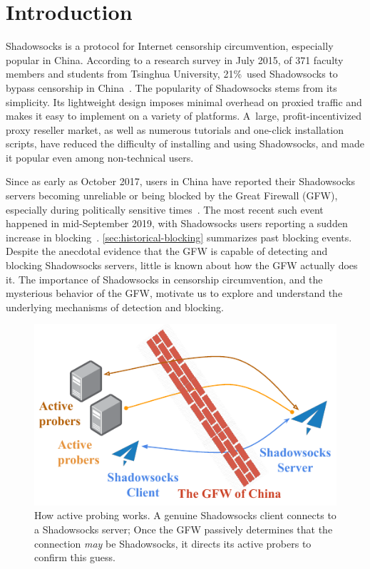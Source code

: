 \documentclass[sigconf,letterpaper]{acmart}
\begin{document}
\maketitle

\section{Introduction}
\label{sec:intro}

Shadowsocks is a protocol for Internet censorship circumvention,
especially popular in China.
According to a research survey in July 2015,
of 371 faculty members and students from Tsinghua University,
21\%~used Shadowsocks to bypass censorship in China~\cite[\S 4.1]{Lu2017a}.
The popularity of Shadowsocks stems from its simplicity.
Its lightweight design imposes minimal overhead on proxied traffic
and makes it easy to implement on a variety of platforms.
A~large, profit-incentivized proxy reseller market,
as well as numerous tutorials and one-click installation scripts,
have reduced the difficulty of installing and using Shadowsocks,
and made it popular even among non-technical users.

Since as early as October 2017,
users in China have reported their Shadowsocks servers becoming unreliable or being blocked
by the Great Firewall (GFW),
especially during politically sensitive times~\cite{bbs2017blocking}.
The most recent such event happened in mid-September 2019,
with Shadowsocks users reporting a sudden increase in blocking~\cite{Fifield2019blocking}.
\autoref{sec:historical-blocking} summarizes past blocking events.
Despite the anecdotal evidence that the GFW is capable of detecting and blocking Shadowsocks servers,
little is known about how the GFW actually does it.
The importance of Shadowsocks in censorship circumvention,
and the mysterious behavior of the GFW,
motivate us to explore and understand the underlying mechanisms of detection and blocking.

\begin{figure}
\includegraphics{figures/active_probing.pdf}
\caption{
How active probing works.
A genuine Shadowsocks client connects to a Shadowsocks server;
Once the GFW passively determines that the connection \emph{may} be Shadowsocks,
it directs its active probers to confirm this guess.
}
\label{fig:active-probing}
\end{figure}
\end{document}
